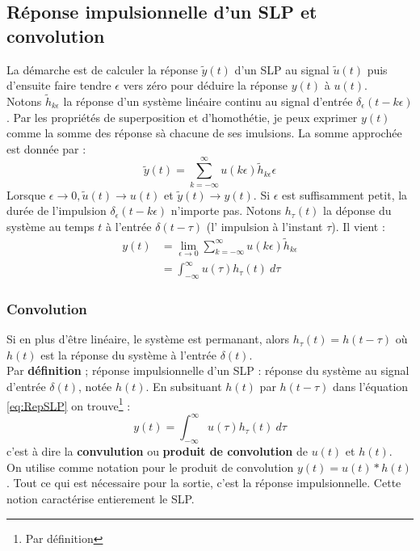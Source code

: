 	\subsection{Réponse impulsionnelle d'un SLP et convolution}
	La démarche est de calculer la réponse $\tilde{y}(t)$ d'un SLP au signal
	$\tilde{u}(t)$ puis d'ensuite faire tendre $\epsilon$ vers zéro pour 
	déduire la réponse $y(t)$ à $u(t)$.\\
	Notons $\tilde{h}_{k\epsilon}$ la réponse d'un système linéaire continu 
	au signal d'entrée $\delta_\epsilon(t-k\epsilon)$. Par les propriétés de 
	superposition et d'homothétie, je peux exprimer $y(t)$ comme la 
	somme des réponse sà chacune de ses imulsions. La somme approchée est 
	donnée par : 
	\begin{equation}
	\tilde{y}(t) = \sum_{k=-\infty}^\infty u(k\epsilon)\tilde{h}_{k\epsilon}
	\epsilon
	\end{equation}
	Lorsque $\epsilon\rightarrow0, \tilde{u}(t)\rightarrow u(t)$ et $\tilde{y}
	(t) \rightarrow y(t)$. Si $\epsilon$ est suffisamment petit, la durée de 
	l'impulsion $\delta_\epsilon(t-k\epsilon)$ n'importe pas. Notons $h_\tau(t
	)$ la déponse du système au temps $t$ à l'entrée $\delta(t-\tau)$ (l'
	impulsion à l'instant $\tau$). Il vient : 
	\begin{equation}
	\begin{array}{ll}
	y(t) &= \lim\limits_{\epsilon\rightarrow0} \sum_{k=-\infty}^\infty u(k\epsilon)
	\tilde{h}_{k\epsilon}\\
	 &= \int_{-\infty}^\infty u(\tau)h_\tau(t)\ d\tau
	\end{array}
	\label{eq:RepSLP}
	\end{equation}
	
		 \subsubsection{Convolution}
		 Si en plus d'\^etre linéaire, le système est permanant, alors $h_\tau(
		 t) = h(t-\tau)$ où $h(t)$ est la réponse du système à l'entrée $\delta
		 (t)$.\\
		 Par \textbf{définition} ; réponse impulsionnelle d'un SLP : réponse du
		 système au signal d'entrée $\delta(t)$, notée $h(t)$. En subsituant 
		 $h(t)$ par $h(t-\tau)$ dans l'équation \autoref{eq:RepSLP} on 
		 trouve\footnote{Par définition} :
		 \begin{equation}
		 y(t) = \int_{-\infty}^\infty u(\tau)h_\tau(t)\ d\tau
		 \end{equation}
		 c'est à dire la \textbf{convulution} ou \textbf{produit de convolution} 
		 de $u(t)$ et $h(t)$.\\
		 On utilise comme notation pour le produit de convolution $y(t) = u(t)*
		 h(t)$. Tout ce qui est nécessaire pour la sortie, c'est la réponse 
		 impulsionnelle. Cette notion caractérise entierement le SLP.
	

